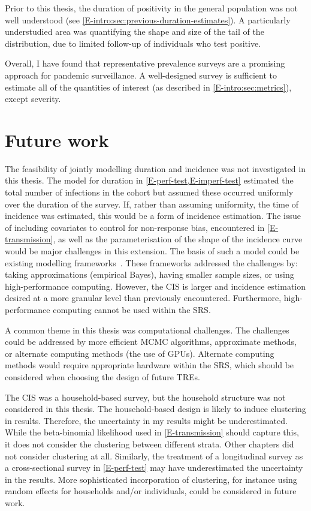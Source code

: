 \documentclass[thesis.tex]{subfiles}
\begin{document}
Prior to this thesis, the duration of positivity in the general population was not well understood (see \cref{E-intro:sec:previous-duration-estimates}).
A particularly understudied area was quantifying the shape and size of the tail of the distribution, due to limited follow-up of individuals who test positive.

Overall, I have found that representative prevalence surveys are a promising approach for pandemic surveillance.
A well-designed survey is sufficient to estimate all of the quantities of interest (as described in \cref{E-intro:sec:metrics}), except severity.


\section{Future work} \label{conclusion:sec:future-work}

The feasibility of jointly modelling duration and incidence was not investigated in this thesis.
The model for duration in \cref{E-perf-test,E-imperf-test} estimated the total number of infections in the cohort but assumed these occurred uniformly over the duration of the survey.
If, rather than assuming uniformity, the time of incidence was estimated, this would be a form of incidence estimation.
The issue of including covariates to control for non-response bias, encountered in \cref{E-transmission}, as well as the parameterisation of the shape of the incidence curve would be major challenges in this extension.
The basis of such a model could be existing modelling frameworks~\autocite[e.g.][]{taffeJoint,haySerosolver}.
These frameworks addressed the challenges by: taking approximations (\eg empirical Bayes), having smaller sample sizes, or using high-performance computing.
However, the CIS is larger and incidence estimation desired at a more granular level than previously encountered.
Furthermore, high-performance computing cannot be used within the SRS.

A common theme in this thesis was computational challenges.
The challenges could be addressed by more efficient MCMC algorithms, approximate methods, or alternate computing methods (\eg the use of GPUs).
Alternate computing methods would require appropriate hardware within the SRS, which should be considered when choosing the design of future TREs.

The CIS was a household-based survey, but the household structure was not considered in this thesis.
The household-based design is likely to induce clustering in results.
Therefore, the uncertainty in my results might be underestimated.
While the beta-binomial likelihood used in \cref{E-transmission} should capture this, it does not consider the clustering between different strata.
Other chapters did not consider clustering at all.
Similarly, the treatment of a longitudinal survey as a cross-sectional survey in \cref{E-perf-test} may have underestimated the uncertainty in the results.
More sophisticated incorporation of clustering, for instance using random effects for households and/or individuals, could be considered in future work.
\end{document}
